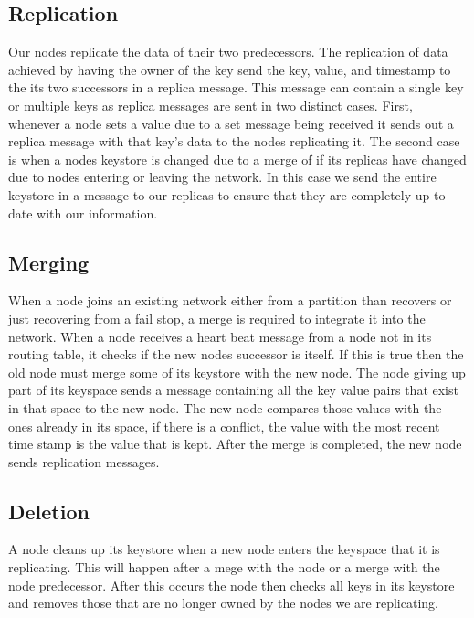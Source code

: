 \documentclass[11pt]{article}
\begin{document}
\subsection{Replication}\label{sec:Rep}

Our nodes replicate the data of their two predecessors. The replication of data achieved by having the owner of the key send the key, value, and timestamp to the its two successors in a replica message. This message can contain a single key or multiple keys as replica messages are sent in two distinct cases. First, whenever a node sets a value due to a set message being received it sends out a replica message with that key's data to the nodes replicating it. The second case is when a nodes keystore is changed due to a merge of if its replicas have changed due to nodes entering or leaving the network. In this case we send the entire keystore in a message to our replicas to ensure that they are completely up to date with our information.

\subsection{Merging}\label{sec:Merg}

When a node joins an existing network either from a partition than recovers or just recovering from a fail stop, a merge is required to integrate it into the network. When a node receives a heart beat message from a node not in its routing table, it checks if the new nodes successor is itself. If this is true then the old node must merge some of its keystore with the new node. The node giving up part of its keyspace sends a message containing all the key value pairs that exist in that space to the new node. The new node compares those values with the ones already in its space, if there is a conflict, the value with the most recent time stamp is the value that is kept. After the merge is completed, the new node sends replication messages.

\subsection{Deletion}\label{sec:Del}

A node cleans up its keystore when a new node enters the keyspace that it is replicating. This will happen after a mege with the node or a merge with the node predecessor. After this occurs the node then checks all keys in its keystore and removes those that are no longer owned by the nodes we are replicating.
\end{document}
